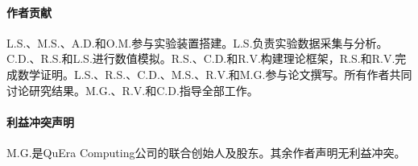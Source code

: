 \documentclass[preprint,superscriptaddress,floatfix, nofootinbib]{revtex4-2}
\begin{document}
\begin{CJK*}{UTF8}{gbsn}
\paragraph*{作者贡献}
L.S.、M.S.、A.D.和O.M.参与实验装置搭建。L.S.负责实验数据采集与分析。C.D.、R.S.和L.S.进行数值模拟。R.S.、C.D.和R.V.构建理论框架，R.S.和R.V.完成数学证明。L.S.、R.S.、C.D.、M.S.、R.V.和M.G.参与论文撰写。所有作者共同讨论研究结果。M.G.、R.V.和C.D.指导全部工作。

\paragraph*{利益冲突声明}
M.G.是QuEra Computing公司的联合创始人及股东。其余作者声明无利益冲突。

\nocite{*}



\end{CJK*}
\end{document}

